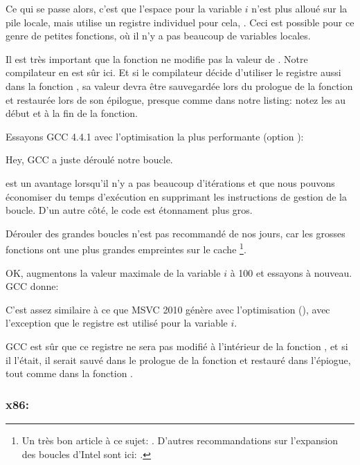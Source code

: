 Ce qui se passe alors, c'est que l'espace pour la variable $i$ n'est plus alloué
sur la pile locale, mais utilise un registre individuel pour cela, \ESI. Ceci est
possible pour ce genre de petites fonctions, où il n'y a pas beaucoup de variables
locales.

Il est très important que la fonction \ttf ne modifie pas la valeur de \ESI.
Notre compilateur en est sûr ici.
Et si le compilateur décide d'utiliser le registre \ESI aussi dans la fonction \ttf,
sa valeur devra être sauvegardée lors du prologue de la fonction et restaurée lors
de son épilogue, presque comme dans notre listing: notez les 
au début et à la fin de la fonction.

Essayons GCC 4.4.1 avec l'optimisation la plus performante (option \Othree):




Hey, GCC a juste déroulé notre boucle.

 est un avantage lorsqu'il n'y a pas
beaucoup d'itérations et que nous pouvons économiser du temps d'exécution en supprimant
les instructions de gestion de la boucle.
D'un autre côté, le code est étonnament plus gros.

Dérouler des grandes boucles n'est pas recommandé de nos jours, car les grosses fonctions
ont une plus grandes empreintes sur le cache%
%
\footnote{Un très bon article à ce sujet: \DrepperMemory.
D'autres recommandations sur l'expansion des boucles d'Intel sont ici:
.}.

OK, augmentons la valeur maximale de la variable $i$ à 100 et essayons à nouveau.
GCC donne:



C'est assez similaire à ce que MSVC 2010 génère avec l'optimisation (\Ox), avec l'exception
que le registre \EBX est utilisé pour la variable $i$.

GCC est sûr que ce registre ne sera pas modifié à l'intérieur de la fonction \ttf,
et si il l'était, il serait sauvé dans le prologue de la fonction et restauré dans
l'épiogue, tout comme dans la fonction \main.

\clearpage
\subsubsection{x86: \olly}
\myindex{\olly}

